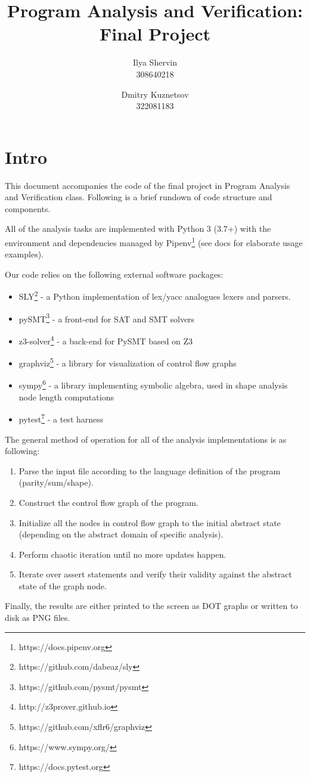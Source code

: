 \documentclass[12pt,a4paper]{article}
\title{Program Analysis and Verification:\\Final Project}
\author{Ilya Shervin\\ 308640218 
        \and
        Dmitry Kuznetsov\\ 322081183}
\theoremstyle{definition}
\begin{document}
\maketitle
	\section*{Intro}
	This document accompanies the code of the final project in Program Analysis and Verification class. Following is a brief rundown of code structure and components.
	
	All of the analysis tasks are implemented with Python 3 (3.7+) with the environment and dependencies managed by Pipenv\footnote{https://docs.pipenv.org} (see docs for elaborate usage examples).
	
	Our code relies on the following external software packages:
	\begin{itemize}
		\item SLY\footnote{https://github.com/dabeaz/sly} - a Python implementation of lex/yacc analogues lexers and parsers.
		\item pySMT\footnote{https://github.com/pysmt/pysmt} - a front-end for SAT and SMT solvers
		\item z3-solver\footnote{http://z3prover.github.io} - a back-end for PySMT based on Z3
		\item graphviz\footnote{https://github.com/xflr6/graphviz} - a library for visualization of control flow graphs
		\item sympy\footnote{https://www.sympy.org/} - a library implementing symbolic algebra, used in shape analysis node length computations
		\item pytest\footnote{https://docs.pytest.org} - a test harness
	\end{itemize}
The general method of operation for all of the analysis implementations is as following:
\begin{enumerate}
	\item Parse the input file according to the language definition of the program (parity/sum/shape).
	\item Construct the control flow graph of the program.
	\item Initialize all the nodes in control flow graph to the initial abstract state (depending on the abstract domain of specific analysis).
	\item Perform chaotic iteration until no more updates happen.
	\item Iterate over assert statements and verify their validity against the abstract state of the graph node.
\end{enumerate}
Finally, the results are either printed to the screen as DOT graphs or written to disk as PNG files.
\end{document}
